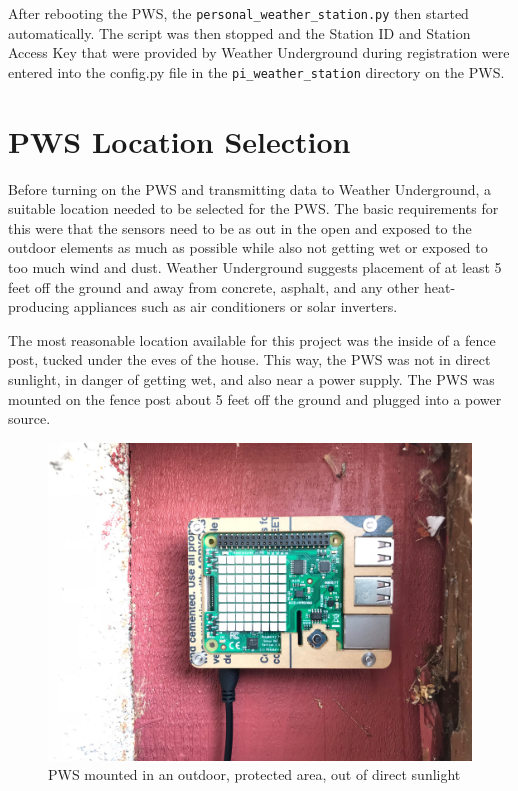 \documentclass[sigconf]{acmart}
\begin{document}
After rebooting the PWS, the \verb|personal_weather_station.py| then started automatically. The script was then stopped and the Station ID and Station Access Key that were provided by Weather Underground during registration were entered into the config.py file in the \verb|pi_weather_station| directory on the PWS.

\section{PWS Location Selection}

Before turning on the PWS and transmitting data to Weather Underground, a suitable location needed to be selected for the PWS. The basic requirements for this were that the sensors need to be as out in the open and exposed to the outdoor elements as much as possible while also not getting wet or exposed to too much wind and dust. Weather Underground suggests placement of at least 5 feet off the ground and away from concrete, asphalt, and any other heat-producing appliances such as air conditioners or solar inverters. 

The most reasonable location available for this project was the inside of a fence post, tucked under the eves of the house. This way, the PWS was not in direct sunlight, in danger of getting wet, and also near a power supply. The PWS was mounted on the fence post about 5 feet off the ground and plugged into a power source. 

\begin{figure}[htb]
    \centering
    \includegraphics[width=\columnwidth]{images/Location1.jpg}
    \caption{PWS mounted in an outdoor, protected area, out of direct sunlight}
\end{figure}
\end{document}
